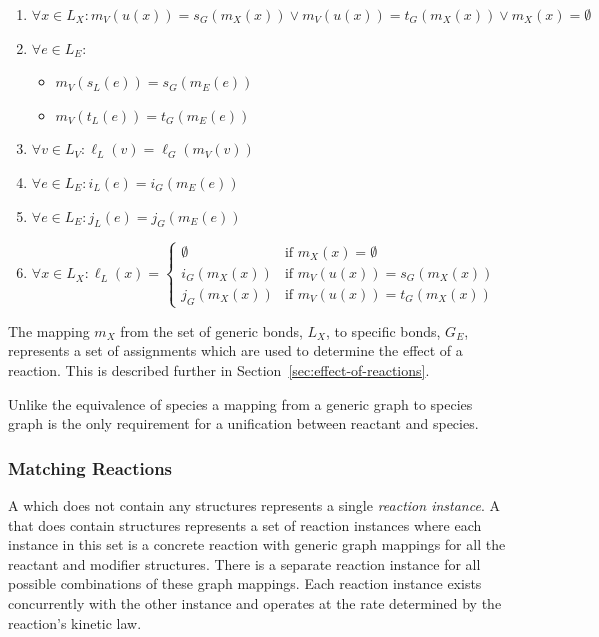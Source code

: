 \documentclass{cekarticle}
\begin{document}
\begin{enumerate}

\item $\forall x \in L_{X} : m_{V}(u(x)) = s_{G}(m_{X}(x)) \vee
m_{V}(u(x)) = t_{G}(m_{X}(x)) \vee m_{X}(x) = \emptyset$

\item $\forall e \in L_{E} : $
    \begin{itemize}
    \item $m_{V}(s_{L}(e))= s_{G}(m_{E}(e))$
    \item $m_{V}(t_{L}(e))= t_{G}(m_{E}(e))$
    \end{itemize}
\item $\forall v \in L_{V} : \ell_{L}(v) = \ell_{G}(m_{V}(v))$
\item $\forall e \in L_{E} : i_{L}(e) = i_{G}(m_{E}(e))$
\item $\forall e \in L_{E} : j_{L}(e) = j_{G}(m_{E}(e))$
\item $ \forall x \in L_{X} : \ell_{L}(x) = \left\{
\begin{array}{ll}
\emptyset & \mbox{if $m_{X}(x) = \emptyset $}\\
i_{G}(m_{X}(x)) & \mbox{if $m_{V}(u(x)) = s_{G}(m_{X}(x))$}\\
j_{G}(m_{X}(x)) & \mbox{if $m_{V}(u(x)) = t_{G}(m_{X}(x))$}
\end{array} \right. $
\end{enumerate}

The mapping $m_{X}$ from the set of generic bonds, $L_{X}$, to
specific bonds, $G_{E}$, represents a set of assignments which are
used to determine the effect of a reaction. This is described
further in Section~\ref{sec:effect-of-reactions}.

Unlike the equivalence of species a mapping from a generic graph
to species graph is the only requirement for a unification between
reactant and species.

\subsubsection{Matching Reactions}

A  which does not contain any  structures represents a single
\emph{reaction instance}.  A  that does contain  structures
represents a set of reaction instances where each instance in this set is a concrete reaction
with generic graph mappings for all the reactant and modifier  structures.
There is a separate reaction instance for all possible combinations of these graph mappings.
Each reaction instance exists concurrently with the other instance and operates at the
rate determined by the reaction's kinetic law.
\end{document}
